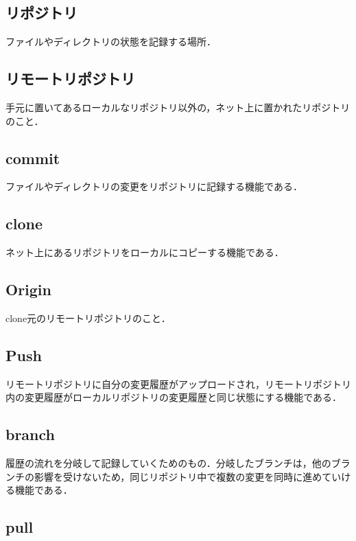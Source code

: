 \subsection{リポジトリ}

ファイルやディレクトリの状態を記録する場所．

\subsection{リモートリポジトリ}

手元に置いてあるローカルなリポジトリ以外の，ネット上に置かれたリポジトリのこと．

\subsection{commit}

ファイルやディレクトリの変更をリポジトリに記録する機能である．


\subsection{clone}

ネット上にあるリポジトリをローカルにコピーする機能である．


\subsection{Origin}

clone元のリモートリポジトリのこと．


\subsection{Push}

リモートリポジトリに自分の変更履歴がアップロードされ，リモートリポジトリ内の変更履歴がローカルリポジトリの変更履歴と同じ状態にする機能である．


\subsection{branch}

履歴の流れを分岐して記録していくためのもの．分岐したブランチは，他のブランチの影響を受けないため，同じリポジトリ中で複数の変更を同時に進めていける機能である．


\subsection{pull}

